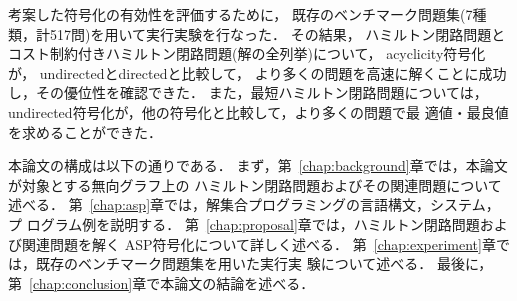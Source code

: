 考案した符号化の有効性を評価するために，
既存のベンチマーク問題集(7種類，計517問)を用いて実行実験を行なった．
その結果，
ハミルトン閉路問題とコスト制約付きハミルトン閉路問題(解の全列挙)について，
\textsf{acyclicity}符号化が，
\textsf{undirected}と\textsf{directed}と比較して，
より多くの問題を高速に解くことに成功し，その優位性を確認できた．
また，最短ハミルトン閉路問題については，
\textsf{undirected}符号化が，他の符号化と比較して，より多くの問題で最
適値・最良値を求めることができた．

本論文の構成は以下の通りである．
まず，第~\ref{chap:background}章では，本論文が対象とする無向グラフ上の
ハミルトン閉路問題およびその関連問題について述べる．
第~\ref{chap:asp}章では，解集合プログラミングの言語構文，システム，プ
ログラム例を説明する．
第~\ref{chap:proposal}章では，ハミルトン閉路問題および関連問題を解く
ASP符号化について詳しく述べる．
第~\ref{chap:experiment}章では，既存のベンチマーク問題集を用いた実行実
験について述べる．
最後に，第~\ref{chap:conclusion}章で本論文の結論を述べる．

